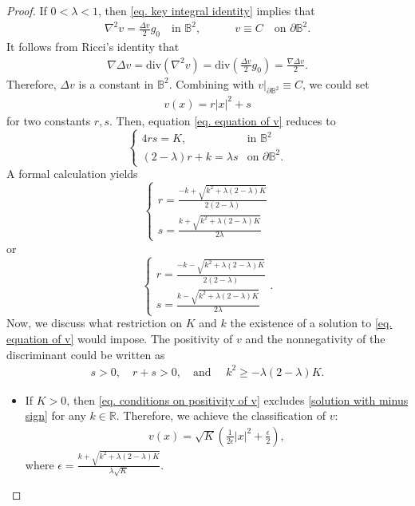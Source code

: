\documentclass[11pt,a4paper,twoside]{amsart}
\newtheorem{sketch proof}{Sketch of the proof}[section]
\begin{document}
\begin{proof}
If $0<\lambda<1$, then \cref{eq. key integral identity} implies that
\begin{align*}
    \nabla^2 v=\frac{\Delta v}{2}g_0\quad 
    \text{in }\mathbb{B}^2,\qquad\quad 
    v\equiv C\quad  \text{on }\partial\mathbb{B}^2.
\end{align*}
It follows from Ricci's identity that
\begin{align*}
    \nabla \Delta v
    =\mathrm{div}(\nabla^2v)
    =\mathrm{div}\left(\frac{\Delta v}{2}g_0\right)
    =\frac{\nabla \Delta v}{2}.
\end{align*}
Therefore, $\Delta v$ is a constant in $\mathbb{B}^2$. Combining with $v|_{\partial\mathbb{B}^2}\equiv C$, we could set 
\begin{align*}
    v(x)=r|x|^2+s
\end{align*}
for two constants $r,s$. Then, equation \cref{eq. equation of v} reduces to
\begin{equation}
\label{eq. quadratic equation for rs}
    \begin{cases}
        4rs=K, &\text{in } \mathbb{B}^2\\[2mm]
        (2-\lambda)r+k=\lambda s &\text{on } \partial \mathbb{B}^2.
    \end{cases}
\end{equation}
A formal calculation yields
\begin{equation}
    \begin{cases}
        r=\frac{-k+\sqrt{k^2+\lambda(2-\lambda)K}}{2(2-\lambda)}\\[2mm]
        s=\frac{k+\sqrt{k^2+\lambda(2-\lambda)K}}{2\lambda}
    \end{cases} \label{solution with plus sign}
\end{equation}
or
\begin{equation}
    \begin{cases}
        r=\frac{-k-\sqrt{k^2+\lambda(2-\lambda)K}}{2(2-\lambda)}\\[2mm]
        s=\frac{k-\sqrt{k^2+\lambda(2-\lambda)K}}{2\lambda}
    \end{cases}\label{solution with minus sign}.
\end{equation}
Now, we discuss what restriction on $K$ and $k$ the existence of a solution to \cref{eq. equation of v} would impose.
The positivity of $v$ and the nonnegativity of the discriminant could be  written as
\begin{align}\label{eq. conditions on positivity of v}
    s>0,\quad r+s>0,\quad 
    \text{and } \quad k^2\geq -\lambda(2-\lambda)K.
\end{align}
\begin{itemize}
    \item  If $K>0$, then \cref{eq. conditions on positivity of v} excludes  \cref{solution with minus sign}
for any $k\in\mathbb{R}$. Therefore, we achieve the classification of $v$:
\begin{align*}
    v(x)=\sqrt{K}\left(\frac{1}{2\epsilon}|x|^2+\frac{\epsilon}{2}\right),
\end{align*}
where $\epsilon=\frac{k+\sqrt{k^2+\lambda(2-\lambda)K}}{\lambda\sqrt{K}}$.


\end{itemize}
\end{proof}
\end{document}
